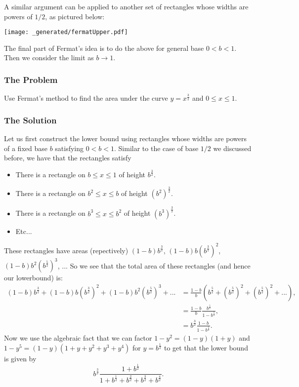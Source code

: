 A similar argument can be applied to another set of rectangles whose widths are powers of \(1/2\), as pictured below:

\texttt{[image: \_generated/fermatUpper.pdf]}

The final part of Fermat's idea is to do the above for general base \(0 < b < 1\). Then we consider the limit as \(b \to 1\).

\subsubsection*{The Problem}

Use Fermat's method to find the area under the curve \(y = x^{\frac{3}{2}}\) and \(0 \leq x \leq 1\).

\subsubsection*{The Solution}

Let us first construct the lower bound using rectangles whose widths are powers of a fixed base \(b\) satisfying \(0 < b < 1\). 
Similar to the case of base \(1/2\) we discussed before, we have that the rectangles satisfy
\begin{itemize}
\item There is a rectangle on \(b \leq x \leq 1\) of height \(b^{\frac{3}{2}}\).
\item There is a rectangle on \(b^2 \leq x \leq b\) of height \(\left(b^2\right)^{\frac{3}{2}}\).
\item There is a rectangle on \(b^3 \leq x \leq b^2\) of height \(\left(b^3\right)^{\frac{3}{2}}\).
\item Etc...
\end{itemize}
These rectangles have areas (repectively) \((1 - b)b^{\frac{3}{2}}\), \((1 - b) b\left(b^{\frac{3}{2}}\right)^2\), \((1-b)b^2\left(b^{\frac{5}{2}}\right)^3\), ...
So we see that the total area of these rectangles (and hence our lowerbound) is:
\begin{align}
(1 - b)b^{\frac{3}{2}} + (1 - b) b\left(b^{\frac{3}{2}}\right)^2 + (1-b)b^2\left(b^{\frac{5}{2}}\right)^3 + ... 
    & = \frac{1 - b}{b} \left( b^{\frac{5}{2}} + \left(b^{\frac{5}{2}}\right)^2 + \left(b^{\frac{5}{2}}\right)^2 + ...\right), \\
    & = \frac{1 - b}{b} \frac{b^{\frac{5}{2}}} {1 - b^{\frac{5}{2}}}, \\
    & = b^{\frac{3}{2}} \frac{1 - b}{1 - b^{\frac{5}{2}}}.
\end{align}
Now we use the algebraic fact that we can factor \(1 - y^2 = (1  - y) (1 + y)\) and \(1 - y^5 = (1 - y)(1 + y + y^2 + y^3 + y^4)\) for \(y = b^{\frac{1}{2}}\) to get that the lower bound is given by
\begin{equation}
b^{\frac{3}{2}} \frac{1 + b^{\frac{1}{2}}}
    {1 + b^{\frac{1}{2}} + b^{\frac{2}{2}} + b^{\frac{3}{2}} + b^{\frac{4}{2}}}.
\end{equation}

